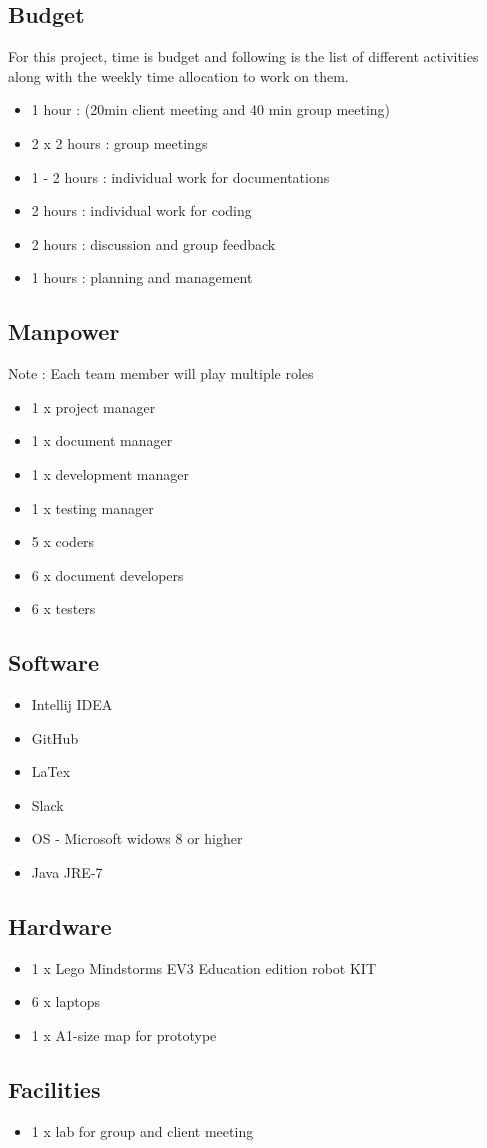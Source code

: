 \subsection{Budget}
For this project, time is budget and following is the list of different activities along with the weekly time allocation to work on them.  
\begin{itemize}
\item 1 hour  : (20min client meeting and 40 min group meeting)
\item 2 x 2 hours : group meetings 
\item 1 - 2 hours : individual work for documentations
\item 2 hours : individual work for coding 
\item 2 hours : discussion and group feedback  
\item 1 hours : planning and management
\end{itemize}

\subsection{Manpower}
Note : Each team member will play multiple roles 
\begin{itemize}
\item 1 x project manager
\item 1 x document manager
\item 1 x development manager
\item 1 x testing manager
\item 5 x coders
\item 6 x document developers
\item 6 x testers
\end{itemize}
\subsection{Software}
\begin{itemize}
\item Intellij IDEA
\item GitHub
\item LaTex
\item Slack
\item OS - Microsoft widows 8 or higher
\item Java JRE-7
\end{itemize}

\subsection{Hardware}
\begin{itemize}
\item 1 x Lego Mindstorms EV3 Education edition robot KIT
\item 6 x laptops
\item 1 x A1-size map for prototype
\end{itemize}

\subsection{Facilities}
\begin{itemize}
\item 1 x lab for group and client meeting 
\end{itemize}
